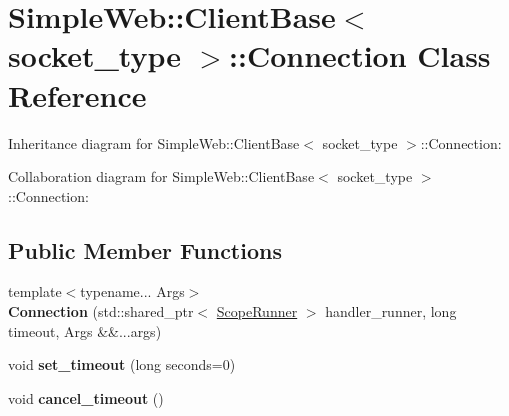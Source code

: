 \hypertarget{classSimpleWeb_1_1ClientBase_1_1Connection}{}\section{Simple\+Web\+:\+:Client\+Base$<$ socket\+\_\+type $>$\+:\+:Connection Class Reference}
\label{classSimpleWeb_1_1ClientBase_1_1Connection}


Inheritance diagram for Simple\+Web\+:\+:Client\+Base$<$ socket\+\_\+type $>$\+:\+:Connection\+:


Collaboration diagram for Simple\+Web\+:\+:Client\+Base$<$ socket\+\_\+type $>$\+:\+:Connection\+:
\subsection*{Public Member Functions}
\begin{DoxyCompactItemize}
\item 
{\footnotesize template$<$typename... Args$>$ }\\{\bfseries Connection} (std\+::shared\+\_\+ptr$<$ \hyperlink{classSimpleWeb_1_1ScopeRunner}{Scope\+Runner} $>$ handler\+\_\+runner, long timeout, Args \&\&...args)\hypertarget{classSimpleWeb_1_1ClientBase_1_1Connection_a8961de97947ee47668ec61e0cdea8e00}{}\label{classSimpleWeb_1_1ClientBase_1_1Connection_a8961de97947ee47668ec61e0cdea8e00}

\item 
void {\bfseries set\+\_\+timeout} (long seconds=0)\hypertarget{classSimpleWeb_1_1ClientBase_1_1Connection_a169f182df0cd8fe3859fe95b2884ca43}{}\label{classSimpleWeb_1_1ClientBase_1_1Connection_a169f182df0cd8fe3859fe95b2884ca43}

\item 
void {\bfseries cancel\+\_\+timeout} ()\hypertarget{classSimpleWeb_1_1ClientBase_1_1Connection_a0b70983003faeac368e3269f7145295e}{}\label{classSimpleWeb_1_1ClientBase_1_1Connection_a0b70983003faeac368e3269f7145295e}

\end{DoxyCompactItemize}
